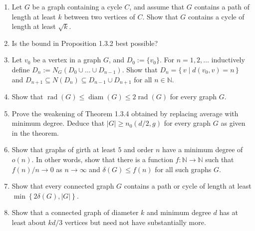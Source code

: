 \documentclass{article}
\theoremstyle{remark}
\begin{document}
\begin{enumerate}
            \item Let \(G\) be a graph containing a cycle \(C\), and assume that \(G\) contains a path of length at least \(k\) between two vertices of \(C\). Show that \(G\) contains a cycle of length at least \(\sqrt{k}\).
        
            \item Is the bound in Proposition 1.3.2 best possible?
        
            \item Let \(v_{0}\) be a vertex in a graph \(G\), and \(D_{0} := \{v_{0}\}\). For \(n = 1, 2, \ldots\) inductively define \(D_{n} := N_{G}(D_{0} \cup \ldots \cup D_{n-1})\). Show that \(D_{n} = \{\,v \;|\; d(v_{0}, v) = n\,\}\) and \(D_{n+1} \subseteq N(D_{n}) \subseteq D_{n-1} \cup D_{n+1}\) for all \(n \in \mathbb{N}\).
        
            \item Show that \(\operatorname{rad}(G) \leqslant \operatorname{diam}(G) \leqslant 2 \operatorname{rad}(G)\) for every graph \(G\).
        
            \item Prove the weakening of Theorem 1.3.4 obtained by replacing average with minimum degree. Deduce that \(|G| \geqslant n_{0}(d/2, g)\) for every graph \(G\) as given in the theorem.
        
            \item Show that graphs of girth at least \(5\) and order \(n\) have a minimum degree of \(o(n)\). In other words, show that there is a function \(f \colon \mathbb{N} \to \mathbb{N}\) such that \(f(n)/n \to 0\) as \(n \to \infty\) and \(\delta(G) \leqslant f(n)\) for all such graphs \(G\).
        
            \item Show that every connected graph \(G\) contains a path or cycle of length at least \(\min\left\{2\delta(G), |G|\right\}\).
        
            \item Show that a connected graph of diameter \(k\) and minimum degree \(d\) has at least about \(kd/3\) vertices but need not have substantially more.
    \end{enumerate}
\end{document}
